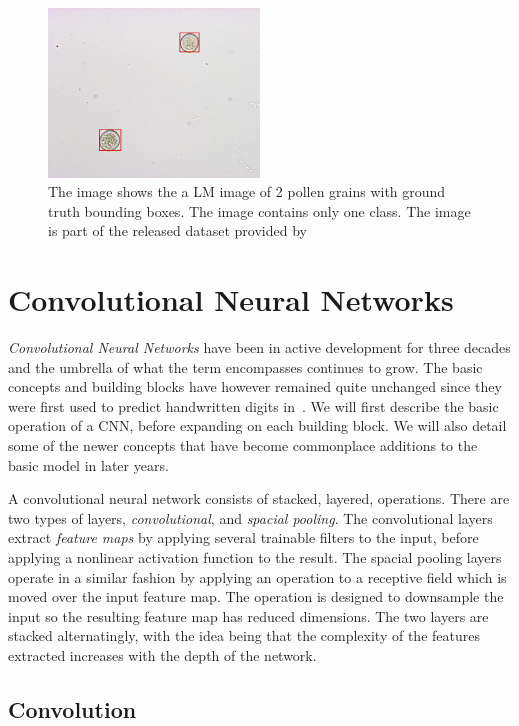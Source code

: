 \begin{figure}[htb]
  \centering
  \includegraphics[width=0.5\textwidth]{figs/0040_068.jpg}
  \caption[Bounding boxes]{The image shows the a LM image of 2 pollen grains with ground truth bounding boxes.
The image contains only one class.
The image is part of the released dataset provided by~\cite{gallardo_caballero_precise_2019}}\label{fig:bbox}
\end{figure}

\section{Convolutional Neural Networks}
\textit{Convolutional Neural Networks} have been in active development for three decades and the umbrella of what the term encompasses continues to grow.
The basic concepts and building blocks have however remained quite unchanged since they were first used to predict handwritten digits in~\cite{1989Hdrw}.
We will first describe the basic operation of a CNN, before expanding on each building block.
We will also detail some of the newer concepts that have become commonplace additions to the basic model in later years.

A convolutional neural network consists of stacked, layered, operations.
There are two types of layers, \textit{convolutional}, and \textit{spacial pooling}.
The convolutional layers extract \textit{feature maps} by applying several trainable filters to the input, before applying a nonlinear activation function to the result.
The spacial pooling layers operate in a similar fashion by applying an operation to a receptive field which is moved over the input feature map.
The operation is designed to downsample the input so the resulting feature map has reduced dimensions.
The two layers are stacked alternatingly, with the idea being that the complexity of the features extracted increases with the depth of the network.

\subsection{Convolution}

